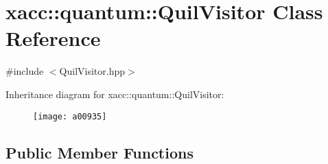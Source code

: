 \hypertarget{a00935}{}\section{xacc\+:\+:quantum\+:\+:Quil\+Visitor Class Reference}
\label{a00935}


{\ttfamily \#include $<$Quil\+Visitor.\+hpp$>$}

Inheritance diagram for xacc\+:\+:quantum\+:\+:Quil\+Visitor\+:\begin{figure}[H]
\begin{center}
\leavevmode
\texttt{[image: a00935]}
\end{center}
\end{figure}
\subsection*{Public Member Functions}
